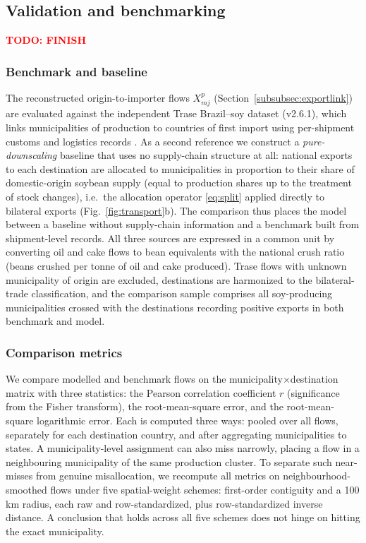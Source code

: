 \subsection{Validation and benchmarking}\label{subsec:validation}
\textcolor{red}{\textbf{TODO: FINISH}}

\subsubsection{Benchmark and baseline}\label{subsubsec:benchmarks}
The reconstructed origin-to-importer flows $X^p_{mj}$
(Section~\ref{subsubsec:exportlink}) are evaluated against the independent
Trase Brazil--soy dataset (v2.6.1), which links municipalities of production
to countries of first import using per-shipment customs and logistics records
\cite{godar2015sei,escobar2020trase}. As a second reference we construct a
\emph{pure-downscaling} baseline that uses no supply-chain structure at all:
national exports to each destination are allocated to municipalities in
proportion to their share of domestic-origin soybean supply (equal to
production shares up to the treatment of stock changes), i.e.\ the allocation
operator \eqref{eq:split} applied directly to bilateral exports
(Fig.~\ref{fig:transport}b). The
comparison thus places the model between a baseline without supply-chain
information and a benchmark built from shipment-level records. All three sources are expressed in a common
unit by converting oil and cake flows to bean equivalents with the national
crush ratio (beans crushed per tonne of oil and cake produced). Trase flows
with unknown municipality of origin are excluded, destinations are harmonized
to the bilateral-trade classification, and the comparison sample comprises all
soy-producing municipalities crossed with the destinations recording positive
exports in both benchmark and model.

\subsubsection{Comparison metrics}\label{subsubsec:metrics}
We compare modelled and benchmark flows on the
municipality$\times$destination matrix with three statistics: the Pearson
correlation coefficient $r$ (significance from the Fisher transform), the
root-mean-square error, and the root-mean-square logarithmic error. Each is
computed three ways: pooled over all flows, separately for each destination
country, and after aggregating municipalities to states. A municipality-level
assignment can also miss narrowly, placing a flow in a neighbouring
municipality of the same production cluster. To separate such near-misses
from genuine misallocation, we recompute all metrics on
neighbourhood-smoothed flows under five spatial-weight schemes: first-order
contiguity and a 100\,km radius, each raw and row-standardized, plus
row-standardized inverse distance. A conclusion that holds across all five
schemes does not hinge on hitting the exact municipality.

